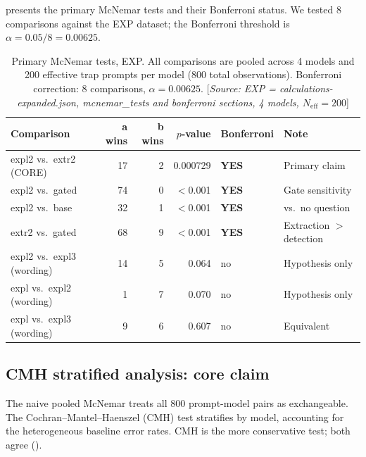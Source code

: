 \documentclass[11pt,a4paper]{article}
\begin{document}
 presents the primary McNemar tests and their Bonferroni
status.  We tested 8 comparisons against the EXP dataset; the Bonferroni
threshold is $\alpha = 0.05 / 8 = 0.00625$.

\begin{table}[htbp]
\centering
\caption{Primary McNemar tests, EXP.  All comparisons are pooled across
  4 models and 200 effective trap prompts per model (800 total observations).
  Bonferroni correction: 8 comparisons, $\alpha = 0.00625$.
  [\emph{Source: EXP = calculations-expanded.json,
  mcnemar\_tests and bonferroni sections, 4 models,
  $N_\text{eff} = 200$}]}
\label{tab:mcnemar}
\smallskip
\begin{tabular}{@{}lrrrll@{}}
\toprule
Comparison & \textsf{a} wins & \textsf{b} wins & $p$-value
  & Bonferroni & Note \\
\midrule
\textsf{expl2} vs.\ \textsf{extr2} (CORE)
  & 17 & 2 & 0.000729 & \textbf{YES} & Primary claim \\
\textsf{expl2} vs.\ \textsf{gated}
  & 74 & 0 & $<$0.001  & \textbf{YES} & Gate sensitivity \\
\textsf{expl2} vs.\ \textsf{base}
  & 32 & 1 & $<$0.001  & \textbf{YES} & vs.\ no question \\
\textsf{extr2} vs.\ \textsf{gated}
  & 68 & 9 & $<$0.001  & \textbf{YES} & Extraction $>$ detection \\
\textsf{expl2} vs.\ \textsf{expl3} (wording)
  & 14 & 5 & 0.064 & no & Hypothesis only \\
\textsf{expl} vs.\ \textsf{expl2} (wording)
  &  1 & 7 & 0.070 & no & Hypothesis only \\
\textsf{expl} vs.\ \textsf{expl3} (wording)
  &  9 & 6 & 0.607 & no & Equivalent \\
\bottomrule
\end{tabular}
\end{table}

\subsection{CMH stratified analysis: core claim}

The naive pooled McNemar treats all 800 prompt-model pairs as exchangeable.
The Cochran--Mantel--Haenszel (CMH) test stratifies by model, accounting
for the heterogeneous baseline error rates.  CMH is the more conservative
test; both agree ().
\end{document}
